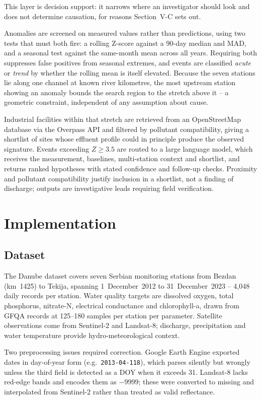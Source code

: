 \documentclass[conference]{IEEEtran}
\begin{document}
This layer is decision support: it narrows where an investigator should look
and does not determine causation, for reasons Section~V-C sets out.

Anomalies are screened on measured values rather than predictions, using two
tests that must both fire: a rolling Z-score against a 90-day median and MAD,
and a seasonal test against the same-month mean across all years. Requiring
both suppresses false positives from seasonal extremes, and events are
classified \emph{acute} or \emph{trend} by whether the rolling mean is itself
elevated. Because the seven stations lie along one channel at known river
kilometres, the most upstream station showing an anomaly bounds the search
region to the stretch above it -- a geometric constraint, independent of any
assumption about cause.

Industrial facilities within that stretch are retrieved from an OpenStreetMap
database via the Overpass API and filtered by pollutant compatibility, giving a
shortlist of sites whose effluent profile could in principle produce the
observed signature. Events exceeding $Z \geq 3.5$ are routed to a large
language model, which receives the measurement, baselines, multi-station
context and shortlist, and returns ranked hypotheses with stated confidence and
follow-up checks. Proximity and pollutant compatibility justify inclusion in a
shortlist, not a finding of discharge; outputs are investigative leads
requiring field verification.

\section{Implementation}

\subsection{Dataset}

The Danube dataset covers seven Serbian monitoring stations from Bezdan
(km~1425) to Tekija, spanning 1~December~2012 to 31~December~2023 -- 4{,}048
daily records per station. Water quality targets are dissolved oxygen, total
phosphorus, nitrate-N, electrical conductance and chlorophyll-a, drawn from
GFQA records at 125--180 samples per station per parameter. Satellite
observations come from Sentinel-2 and Landsat-8; discharge, precipitation and
water temperature provide hydro-meteorological context.

Two preprocessing issues required correction. Google Earth Engine exported
dates in day-of-year form (e.g.\ \texttt{2013-04-118}), which parses silently
but wrongly unless the third field is detected as a DOY when it exceeds 31.
Landsat-8 lacks red-edge bands and encodes them as $-9999$; these were
converted to missing and interpolated from Sentinel-2 rather than treated as
valid reflectance.
\end{document}

